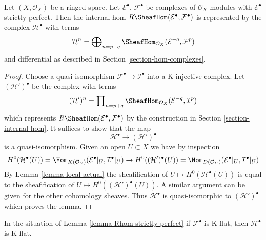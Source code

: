 \begin{lemma}
\label{lemma-Rhom-strictly-perfect}
Let $(X, \mathcal{O}_X)$ be a ringed space.
Let $\mathcal{E}^\bullet$, $\mathcal{F}^\bullet$ be complexes
of $\mathcal{O}_X$-modules with $\mathcal{E}^\bullet$ strictly perfect.
Then the internal hom $R\SheafHom(\mathcal{E}^\bullet, \mathcal{F}^\bullet)$
is represented by the complex $\mathcal{H}^\bullet$ with terms
$$
\mathcal{H}^n =
\bigoplus\nolimits_{n = p + q}
\SheafHom_{\mathcal{O}_X}(\mathcal{E}^{-q}, \mathcal{F}^p)
$$
and differential as described in Section \ref{section-hom-complexes}.
\end{lemma}

\begin{proof}
Choose a quasi-isomorphism $\mathcal{F}^\bullet \to \mathcal{I}^\bullet$
into a K-injective complex. Let $(\mathcal{H}')^\bullet$ be the
complex with terms
$$
(\mathcal{H}')^n =
\prod\nolimits_{n = p + q}
\SheafHom_{\mathcal{O}_X}(\mathcal{E}^{-q}, \mathcal{I}^p)
$$
which represents $R\SheafHom(\mathcal{E}^\bullet, \mathcal{F}^\bullet)$
by the construction in Section \ref{section-internal-hom}. It suffices
to show that the map
$$
\mathcal{H}^\bullet \longrightarrow (\mathcal{H}')^\bullet
$$
is a quasi-isomorphism. Given an open $U \subset X$ we have
by inspection
$$
H^0(\mathcal{H}^\bullet(U)) =
\Hom_{K(\mathcal{O}_U)}(\mathcal{E}^\bullet|_U, \mathcal{I}^\bullet|_U)
\to
H^0((\mathcal{H}')^\bullet(U)) =
\Hom_{D(\mathcal{O}_U)}(\mathcal{E}^\bullet|_U, \mathcal{I}^\bullet|_U)
$$
By Lemma \ref{lemma-local-actual} the sheafification of
$U \mapsto H^0(\mathcal{H}^\bullet(U))$
is equal to the sheafification of
$U \mapsto H^0((\mathcal{H}')^\bullet(U))$. A similar argument can be
given for the other cohomology sheaves. Thus $\mathcal{H}^\bullet$
is quasi-isomorphic to $(\mathcal{H}')^\bullet$ which proves the lemma.
\end{proof}

\begin{lemma}
\label{lemma-Rhom-strictly-perfect-K-flat}
In the situation of Lemma \ref{lemma-Rhom-strictly-perfect}
if $\mathcal{F}^\bullet$ is K-flat, then $\mathcal{H}^\bullet$ is K-flat.
\end{lemma}

